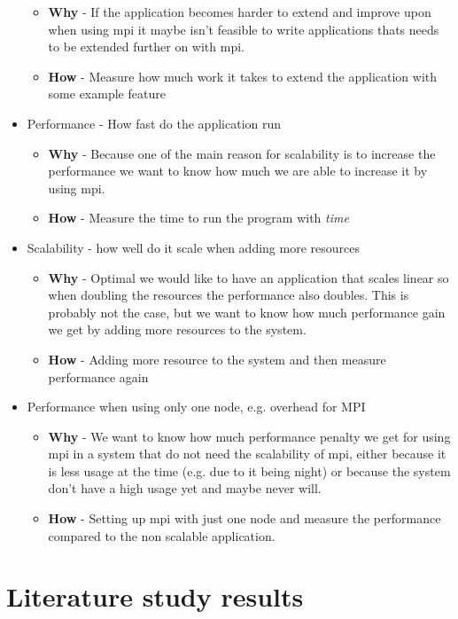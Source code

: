 \documentclass{article}
\begin{document}
\begin{itemize}
\begin{itemize}
\item{ \textbf{Why} - If the application becomes harder to extend and improve upon 
when using mpi it maybe isn't feasible to write applications thats
needs to be extended further on with mpi.}
\item{ \textbf{How} - Measure how much work it takes to extend the application with 
		some example feature}
\end{itemize}
\item Performance - How fast do the application run
\begin{itemize}
\item{ \textbf{Why} - Because one of the main reason for scalability is to increase the
 performance we want to know how much we are able to increase it by using mpi. }
\item{ \textbf{How} - Measure the time to run the program with \emph{time}}
\end{itemize}
\item Scalability - how well do it scale when adding more resources
\begin{itemize}
\item{ \textbf{Why} - Optimal we would like to have an application that scales linear
 so when doubling the resources the performance also doubles. This is probably 
 not the case, but we want to know how much performance gain we get by adding
 more resources to the system. }
\item{ \textbf{How} - Adding more resource to the system and then measure performance
 again}
\end{itemize}
\item Performance when using only one node, e.g. overhead for MPI
\begin{itemize}
\item{ \textbf{Why} - We want to know how much performance penalty we get for using
mpi in a system that do not need the scalability of mpi, either because it is 
less usage at the time (e.g. due to it being night) or because the system
don't have a high usage yet and maybe never will.}
\item{ \textbf{How} - Setting up mpi with just one node and measure the performance
 compared to the non scalable application. }
\end{itemize}
\end{itemize}


 
\section{Literature study results}
\end{document}
